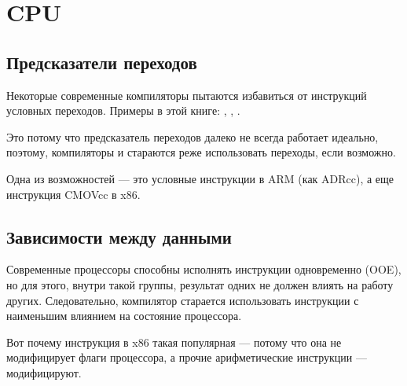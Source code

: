 ﻿\section{CPU}

\subsection{Предсказатели переходов}
\label{branch_predictors}

Некоторые современные компиляторы пытаются избавиться от инструкций условных переходов.
Примеры в этой книге: , , .

Это потому что предсказатель переходов далеко не всегда работает идеально, поэтому, компиляторы и стараются
реже использовать переходы, если возможно.

Одна из возможностей --- это условные инструкции в ARM (как ADRcc), а еще инструкция CMOVcc в x86.

\subsection{Зависимости между данными}

Современные процессоры способны исполнять инструкции одновременно (\ac{OOE}), но для этого,
внутри такой группы, результат одних не должен влиять на работу других.
Следовательно, компилятор старается использовать инструкции с наименьшим влиянием на состояние процессора.

Вот почему инструкция \LEA в x86 такая популярная --- 
потому что она не модифицирует флаги процессора,
а прочие арифметические инструкции --- модифицируют.

